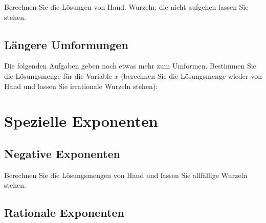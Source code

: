 Berechnen Sie die Lösungen von Hand. Wurzeln, die nicht aufgehen
lassen Sie stehen.


\platzFuerBerechnungenBisEndeSeite{}

\noTRAINER{\newpage}

\subsection{Längere Umformungen}
Die folgenden Aufgaben geben noch etwas mehr zum Umformen. Bestimmen
Sie die Lösungsmenge für die Variable $x$ (berechnen Sie die
Lösungsmenge wieder von Hand und lassen Sie irrationale Wurzeln stehen):

\platzFuerBerechnungenBisEndeSeite{}
\newpage

\section{Spezielle Exponenten}
\subsection{Negative Exponenten}

Berechnen Sie die Lösungsmengen von Hand und lassen Sie allfällige
Wurzeln stehen.

\platzFuerBerechnungenBisEndeSeite{}

\noTRAINER{\newpage}
\subsection{Rationale Exponenten}
\platzFuerBerechnungenBisEndeSeite{}



